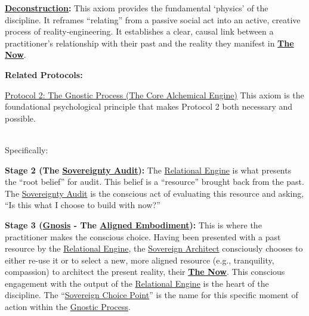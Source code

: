\documentclass{article}
\begin{document}
\begin{nobullet}
    \item \textbf{\hyperlink{gloss:deconstruction}{Deconstruction}:} This axiom provides the fundamental `physics' of the discipline. It reframes ``relating'' from a passive social act into an active, creative process of reality-engineering. It establishes a clear, causal link between a practitioner's relationship with their past and the reality they manifest in \textbf{\hyperlink{gloss:the_now}{The Now}}.
    \item \textbf{Related Protocols:}
        \begin{nobullet}
            \item \hyperref[protocol_2_the_gnostic_process_the_core_alchemical_engine]{Protocol 2: The Gnostic Process (The Core Alchemical Engine)} This axiom is the foundational psychological principle that makes Protocol 2 both necessary and possible.
            
            ~\\Specifically:

            \begin{nobullet}
                \item \textbf{Stage 2 (The \hyperlink{gloss:sovereignty_audit}{Sovereignty Audit}):} The \hyperlink{gloss:relational_engine}{Relational Engine} is what presents the ``root belief'' for audit. This belief is a ``resource'' brought back from the past. The \hyperlink{gloss:sovereignty_audit}{Sovereignty Audit} is the conscious act of evaluating this resource and asking, ``Is this what I choose to build with now?''
                \item \textbf{Stage 3 (\hyperlink{gloss:gnosis}{Gnosis} - The \hyperlink{gloss:aligned_embodiment}{Aligned Embodiment}):} This is where the practitioner makes the conscious choice. Having been presented with a past resource by the \hyperlink{gloss:relational_engine}{Relational Engine}, the \hyperlink{gloss:sovereign_architect}{Sovereign Architect} consciously chooses to either re-use it or to select a new, more aligned resource (e.g., tranquility, compassion) to architect the present reality, their \textbf{\hyperlink{gloss:the_now}{The Now}}. This conscious engagement with the output of the \hyperlink{gloss:relational_engine}{Relational Engine} is the heart of the discipline. The ``\hyperlink{gloss:sovereign_choice_point}{Sovereign Choice Point}'' is the name for this specific moment of action within the \hyperlink{gloss:gnostic_process}{Gnostic Process}.
            \end{nobullet}
        \end{nobullet}
\end{nobullet}
\end{document}
